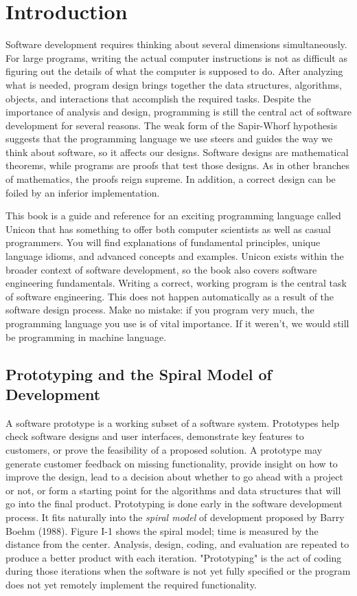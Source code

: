 \chapter{Introduction}

Software development requires thinking about several
dimensions simultaneously. For large programs, writing the actual
computer instructions is not as difficult as figuring out the
details of what the computer is supposed to do. After analyzing what is
needed, program design brings together the data structures, algorithms,
objects, and interactions that accomplish the required tasks. Despite
the importance of analysis and design, programming is still the central
act of software development for several reasons. The weak form of the
Sapir-Whorf hypothesis suggests that the programming
language we use steers and guides the way we think about software, so
it affects our designs. Software designs are mathematical theorems,
while programs are proofs that test those designs. As in other
branches of mathematics, the proofs reign supreme. In addition, a
correct design can be foiled by an inferior implementation.

This book is a guide and reference for an exciting
programming language called Unicon that has something to offer both
computer scientists as well as casual programmers. You
will find explanations of fundamental principles, unique language
idioms, and advanced concepts and examples. Unicon exists within the
broader context of software development, so the book also covers
software engineering fundamentals. Writing a correct, working
program is the central task of software engineering. This does not
happen automatically as a result of the software design process. Make
no mistake: if you program very much, the programming language you use
is of vital importance. If it weren't, we would still
be programming in machine language.

\section{Prototyping and the Spiral Model of Development}

A software prototype is a working subset of a software
system. Prototypes help check software designs and user
interfaces, demonstrate key features to customers, or prove the
feasibility of a proposed solution. A prototype may generate
customer feedback on missing functionality, provide insight on how to
improve the design, lead to a decision about whether to go ahead with a
project or not, or form a starting point for the algorithms and data
structures that will go into the final product. Prototyping is done
early in the software development process. It fits naturally into the
\textit{spiral model} of development proposed by
Barry Boehm (1988). Figure I-1 shows the spiral
model; time is measured by the distance from the center. Analysis,
design, coding, and evaluation are repeated to produce a better product
with each iteration. "Prototyping" is the
act of coding during those iterations when the software is not yet
fully specified or the program does not yet remotely implement the
required functionality.

